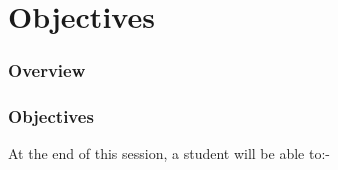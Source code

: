 \documentclass{beamer}
\title{}
\author{Gnanasenthil. G}
\institute{KAPV Government Medical College, Tiruchirapalli}
\date{\today}
\begin{document}
\begin{frame}[plain]
\titlepage
\end{frame}



\section{Objectives}

\begin{frame}[allowframebreaks]
	\frametitle{Overview}
	\fontsize{9pt}{10}\selectfont
	\tableofcontents[currentsection,hideothersubsections,firstsection=1]
	
\end{frame}

\begin{frame}
	\frametitle{Objectives}
	At the end of this session, a student will be able to:-
	\begin{itemize}

	\end{itemize}

\end{frame}
\end{document}
